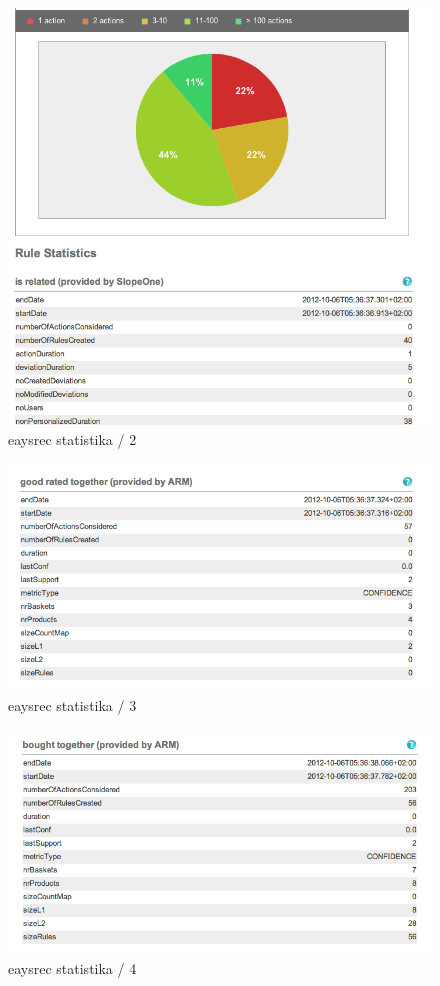 \documentclass[times, utf8, seminar]{fit}
\begin{document}
{{\begin{figure}[H]
\centering
\includegraphics[width=12cm]{img/easyrec_statistika_2.png}
\caption{eaysrec statistika / 2}
\end{figure}

\begin{figure}[H]
\centering
\includegraphics[width=12cm]{img/easyrec_statistika_3.png}
\caption{eaysrec statistika / 3}
\end{figure}

\begin{figure}[H]
\centering
\includegraphics[width=12cm]{img/easyrec_statistika_4.png}
\caption{eaysrec statistika / 4}
\end{figure}

}}
\end{document}
